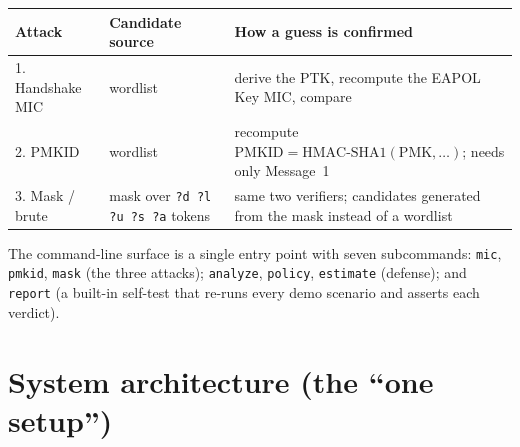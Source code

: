 \documentclass[11pt,a4paper]{article}
\newcommand{\code}[1]{\texttt{#1}}
\begin{document}
\begin{center}
\begin{tabularx}{\textwidth}{@{}l l X@{}}
\toprule
\textbf{Attack} & \textbf{Candidate source} & \textbf{How a guess is confirmed} \\
\midrule
1. Handshake MIC & wordlist & derive the PTK, recompute the EAPOL Key MIC, compare \\
2. PMKID         & wordlist & recompute $\text{PMKID}=\text{HMAC-SHA1}(\text{PMK},\ldots)$; needs only Message~1 \\
3. Mask / brute  & mask over \code{?d ?l ?u ?s ?a} tokens & same two verifiers; candidates generated from the mask instead of a wordlist \\
\bottomrule
\end{tabularx}
\end{center}

\noindent The command-line surface is a single entry point with seven subcommands:
\code{mic}, \code{pmkid}, \code{mask} (the three attacks); \code{analyze}, \code{policy},
\code{estimate} (defense); and \code{report} (a built-in self-test that re-runs every demo
scenario and asserts each verdict).

\section{System architecture (the ``one setup'')}
\end{document}
